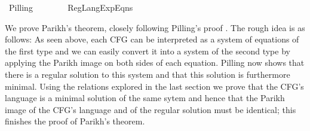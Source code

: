 %
\begin{isabellebody}%
%
%
\isadelimdocument
%
\endisadelimdocument
%
\isatagdocument
%
\isamarkuptrue%
%
\endisatagdocument
{\isafolddocument}%
%
\isadelimdocument
%
\endisadelimdocument
%
\isadelimtheory
%
\endisadelimtheory
%
\isatagtheory
{}\isamarkupfalse%
\ Pilling\isanewline
\ \ \ \isanewline
\ \ \ \ {\isachardoublequoteopen}Reg{\isacharunderscore}{\kern0pt}Lang{\isacharunderscore}{\kern0pt}Exp{\isacharunderscore}{\kern0pt}Eqns{\isachardoublequoteclose}\isanewline
{}%
\endisatagtheory
{\isafoldtheory}%
%
\isadelimtheory
%
\endisadelimtheory
%
\begin{isamarkuptext}%
We prove Parikh's theorem, closely following Pilling's proof \cite{Pilling}. The rough
idea is as follows: As seen above, each CFG can be interpreted as a system of equations of the
first type and we can easily convert it into a system of the second type by applying the Parikh
image on both sides of each equation. Pilling now shows that there is a regular solution to this
system and that this solution is furthermore minimal.
Using the relations explored in the last section we prove that the CFG's language is a minimal
solution of the same sytem and hence that the Parikh image of the CFG's language and of the regular
solution must be identical; this finishes the proof of Parikh's theorem.


\end{isamarkuptext}
\end{isabellebody}
